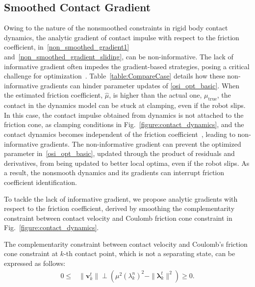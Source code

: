 \subsection{Smoothed Contact Gradient}
Owing to the nature of the nonsmoothed constraints in rigid body contact dynamics, the analytic gradient of contact impulse with respect to the friction coefficient, in~\eqref{non_smoothed_gradient1} and~\eqref{non_smoothed_gradient_sliding}, can be non-informative. The lack of informative gradient often impedes the gradient-based strategies, posing a critical challenge for optimization~\cite{le2024leveraging}. Table~\ref{table:CompareCase} details how these non-informative gradients can hinder parameter updates of \eqref{osi_opt_basic}. When the estimated friction coefficient, $\hat{\mu}$, is higher than the actual one, $\mu_\mathrm{true}$, the contact in the dynamics model can be stuck at clamping, even if the robot slips. In this case, the contact impulse obtained from dynamics is not attached to the friction cone, as clamping conditions in Fig.~\ref{figure:contact_dynamics}, and the contact dynamics becomes independent of the friction coefficient~\cite{raisim}, leading to non-informative gradients. The non-informative gradient can prevent the optimized parameter in~\eqref{osi_opt_basic}, updated through the product of residuals and derivatives, from being updated to better local optima, even if the robot slips. As a result, the nonsmooth dynamics and its gradients can interrupt friction coefficient identification.

To tackle the lack of informative gradient, we propose analytic gradients with respect to the friction coefficient, derived by smoothing the complementarity constraint between contact velocity and Coulomb friction cone constraint in Fig.~\ref{figure:contact_dynamics}.

The complementarity constraint between contact velocity and Coulomb's friction cone constraint at $k$-th contact point, which is not a separating state, can be expressed as follows:
\begin{align}
    0\leq\label{non_smoothing_tangential_cond_complementarity}
    &\|\textbf{v}^{t}_{k}\| \perp{(\mu^2(\lambda^{n}_{k})^2-\|\boldsymbol{\lambda}^{t}_{k}\|^2)}\geq0.
\end{align}


